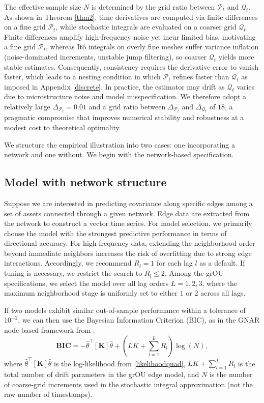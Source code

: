 \documentclass[12pt]{amsart}
\numberwithin{equation}{section}
\newcommand{\1}{\mathbf{1}}
\begin{document}
The effective sample size $N$ is determined by the grid ratio between $\mathcal{P}_t$ and $\mathcal{Q}_t$. As shown in Theorem \ref{thm2}, time derivatives are computed via finite differences on a fine grid $\mathcal{P}_t$, while stochastic integrals are evaluated on a coarser grid $\mathcal{Q}_t$. Finite differences amplify high-frequency noise yet incur limited bias, motivating a fine grid $\mathcal{P}_t$, whereas It\^o integrals on overly fine meshes suffer variance inflation (noise-dominated increments, unstable jump filtering), so coarser $\mathcal{Q}_t$ yields more stable estimates. Consequently, consistency requires the derivative error to vanish faster, which leads to a nesting condition in which $\mathcal{P}_t$ refines faster than $\mathcal{Q}_t$ as imposed in Appendix \ref{discrete}. In practice, the estimator may drift as $\mathcal{Q}_t$ varies due to microstructure noise and model misspecification. We therefore adopt a relatively large $\Delta_{\mathcal{P}_t}=0.01$ and a grid ratio between $\Delta_{\mathcal{P}_t}$ and $\Delta_{\mathcal{Q}_t}$ of $18$, a pragmatic compromise that improves numerical stability and robustness at a modest cost to theoretical optimality.

We structure the empirical illustration into two cases: one incorporating a network and one without. We begin with the network-based specification.
\subsection{Model with network structure}
\label{With a network}
Suppose we are interested in predicting covariance along specific edges among a set of assets connected through a given network. Edge data are extracted from the network to construct a vector time series. For model selection, we primarily choose the model with the strongest predictive performance in terms of directional accuracy. For high-frequency data, extending the neighborhood order beyond immediate neighbors increases the risk of overfitting due to strong edge interactions. Accordingly, we recommend $R_l=1$ for each lag $l$ as a default. If tuning is necessary, we restrict the search to $R_l \leq 2$. Among the grOU specifications, we select the model over all lag orders $L=1,2,3$, where the maximum neighborhood stage is uniformly set to either $1$ or $2$ across all lags.

If two models exhibit similar out-of-sample performance within a tolerance of $10^{-2}$, we can then use the Bayesian Information Criterion (BIC), as in the GNAR node-based framework from \cite{knight2020generalized}:
\begin{equation}
\mathbf{BIC} = -\hat{\theta}^\top\left[\mathbf{K}\right]\hat{\theta}+\left(LK+\sum_{l=1}^LR_l\right)\log(N), 
\end{equation}
where $\hat{\theta}^\top\!\left[\mathbf{K}\right]\hat{\theta}$ is the log-likelihood from \eqref{likelihoodquad}, $LK+\sum_{l=1}^L R_l$ is the total number of drift parameters in the grOU edge model, and $N$ is the number of coarse-grid increments used in the stochastic integral approximation (not the raw number of timestamps).
\end{document}
